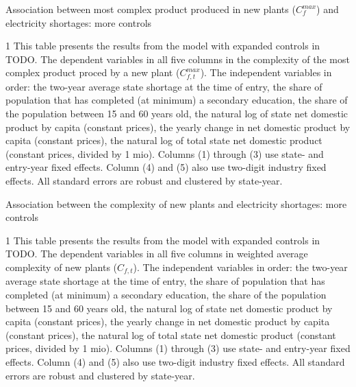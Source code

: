 \documentclass[11pt]{article}
\begin{document}
\begin{table} 
	\begin{center}
		\begin{threeparttable}
			\caption{Association between most complex product produced in new plants ($C^{max}_{f}$) and electricity shortages: more controls}
			\label{tab:entry_max_max}
			
			\begin{tablenotes} \footnotesize 
			\item[1] This table presents the results from the model with expanded controls in TODO. The dependent variables in all five columns in the complexity of the most complex product proced by a new plant ($C^{max}_{f,t}$). The independent variables in order: the two-year average state shortage at the time of entry, the share of population that has completed (at minimum) a secondary education, the share of the population between 15 and 60 years old, the natural log of state net domestic product by capita (constant prices), the yearly change in net domestic product by capita (constant prices), the natural log of total state net domestic product (constant prices, divided by 1 mio). Columns (1) through (3) use state- and entry-year fixed effects. Column (4) and (5) also use two-digit industry fixed effects. All standard errors are robust and clustered by state-year.
			\end{tablenotes}
		\end{threeparttable}
	\end{center}
\end{table}   


\begin{table} 
	\begin{center}
		\begin{threeparttable}
			\caption{Association between the complexity of new plants and electricity shortages: more controls}
			\label{tab:entry_max_max}
			
			\begin{tablenotes} \footnotesize 
			\item[1] This table presents the results from the model with expanded controls in TODO. The dependent variables in all five columns in weighted average complexity of new plants ($C_{f,t}$). The independent variables in order: the two-year average state shortage at the time of entry, the share of population that has completed (at minimum) a secondary education, the share of the population between 15 and 60 years old, the natural log of state net domestic product by capita (constant prices), the yearly change in net domestic product by capita (constant prices), the natural log of total state net domestic product (constant prices, divided by 1 mio). Columns (1) through (3) use state- and entry-year fixed effects. Column (4) and (5) also use two-digit industry fixed effects. All standard errors are robust and clustered by state-year.
			\end{tablenotes}
		\end{threeparttable}
	\end{center}
\end{table}   
\end{document}
